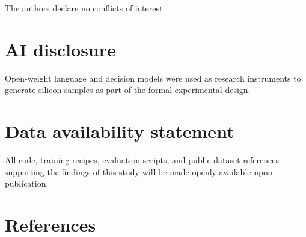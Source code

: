 \documentclass[
  11pt,
  letterpaper,
]{article}
\begin{document}
The authors declare no conflicts of interest.

\section*{AI disclosure}\label{ai-disclosure}

Open-weight language and decision models were used as research
instruments to generate silicon samples as part of the formal
experimental design.

\section*{Data availability
statement}\label{data-availability-statement}

All code, training recipes, evaluation scripts, and public dataset
references supporting the findings of this study will be made openly
available upon publication.

\section*{References}\label{references}
\end{document}

